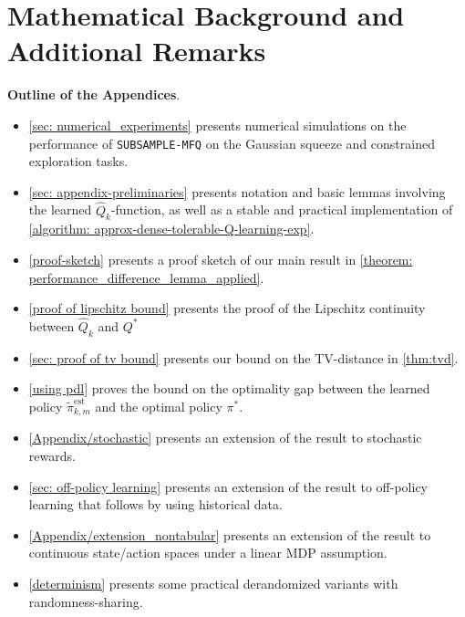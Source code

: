 \documentclass{article}
\theoremstyle{plain}
\theoremstyle{definition}
\def\est{\mathrm{est}}
\begin{document}
\section{Mathematical Background and Additional Remarks}\label{sec:appendix-a}
\textbf{Outline of the Appendices}.
\begin{itemize}
    \item \cref{sec: numerical_experiments} presents numerical simulations on the performance of \texttt{SUBSAMPLE-MFQ} on the Gaussian squeeze and constrained exploration tasks. 
    \item \cref{sec: appendix-preliminaries} presents notation and basic lemmas involving the learned $\hat{Q}_k$-function, as well as a stable and practical implementation of \cref{algorithm: approx-dense-tolerable-Q-learning-exp}.
    \item \cref{proof-sketch} presents a proof sketch of our main result in \cref{theorem: performance_difference_lemma_applied}.
    \item \cref{proof of lipschitz bound} presents the proof of the Lipschitz continuity between $\hat{Q}_k$ and $Q^*$
    \item \cref{sec: proof of tv bound} presents our bound on the TV-distance in \cref{thm:tvd}.
    \item \cref{using pdl} proves the bound on the optimality gap between the learned policy $\tilde{\pi}_{k,m}^\est$ and the optimal policy $\pi^*$.
    \item  \cref{Appendix/stochastic} presents an extension of the result to stochastic rewards.
    \item \cref{sec: off-policy learning} presents an extension of the result to off-policy learning that follows by using historical data.
    \item \cref{Appendix/extension_nontabular} presents an extension of the result to continuous state/action spaces under a linear MDP assumption.
    \item \cref{determinism} presents some practical derandomized variants with randomness-sharing.
\end{itemize}
\end{document}
